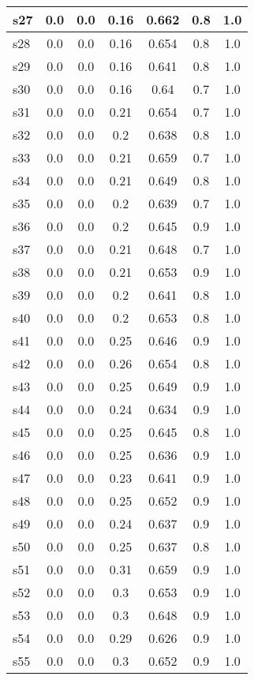 \documentclass{article}
\begin{document}
\begin{tabular}{|l|c|c|c|c|c|c|}
s27 &0.0 & 0.0 & 0.16 & 0.662 & 0.8 & 1.0\\
\hline
s28 &0.0 & 0.0 & 0.16 & 0.654 & 0.8 & 1.0\\
\hline
s29 &0.0 & 0.0 & 0.16 & 0.641 & 0.8 & 1.0\\
\hline
s30 &0.0 & 0.0 & 0.16 & 0.64 & 0.7 & 1.0\\
\hline
s31 &0.0 & 0.0 & 0.21 & 0.654 & 0.7 & 1.0\\
\hline
s32 &0.0 & 0.0 & 0.2 & 0.638 & 0.8 & 1.0\\
\hline
s33 &0.0 & 0.0 & 0.21 & 0.659 & 0.7 & 1.0\\
\hline
s34 &0.0 & 0.0 & 0.21 & 0.649 & 0.8 & 1.0\\
\hline
s35 &0.0 & 0.0 & 0.2 & 0.639 & 0.7 & 1.0\\
\hline
s36 &0.0 & 0.0 & 0.2 & 0.645 & 0.9 & 1.0\\
\hline
s37 &0.0 & 0.0 & 0.21 & 0.648 & 0.7 & 1.0\\
\hline
s38 &0.0 & 0.0 & 0.21 & 0.653 & 0.9 & 1.0\\
\hline
s39 &0.0 & 0.0 & 0.2 & 0.641 & 0.8 & 1.0\\
\hline
s40 &0.0 & 0.0 & 0.2 & 0.653 & 0.8 & 1.0\\
\hline
s41 &0.0 & 0.0 & 0.25 & 0.646 & 0.9 & 1.0\\
\hline
s42 &0.0 & 0.0 & 0.26 & 0.654 & 0.8 & 1.0\\
\hline
s43 &0.0 & 0.0 & 0.25 & 0.649 & 0.9 & 1.0\\
\hline
s44 &0.0 & 0.0 & 0.24 & 0.634 & 0.9 & 1.0\\
\hline
s45 &0.0 & 0.0 & 0.25 & 0.645 & 0.8 & 1.0\\
\hline
s46 &0.0 & 0.0 & 0.25 & 0.636 & 0.9 & 1.0\\
\hline
s47 &0.0 & 0.0 & 0.23 & 0.641 & 0.9 & 1.0\\
\hline
s48 &0.0 & 0.0 & 0.25 & 0.652 & 0.9 & 1.0\\
\hline
s49 &0.0 & 0.0 & 0.24 & 0.637 & 0.9 & 1.0\\
\hline
s50 &0.0 & 0.0 & 0.25 & 0.637 & 0.8 & 1.0\\
\hline
s51 &0.0 & 0.0 & 0.31 & 0.659 & 0.9 & 1.0\\
\hline
s52 &0.0 & 0.0 & 0.3 & 0.653 & 0.9 & 1.0\\
\hline
s53 &0.0 & 0.0 & 0.3 & 0.648 & 0.9 & 1.0\\
\hline
s54 &0.0 & 0.0 & 0.29 & 0.626 & 0.9 & 1.0\\
\hline
s55 &0.0 & 0.0 & 0.3 & 0.652 & 0.9 & 1.0\\

\end{tabular}
\end{document}
